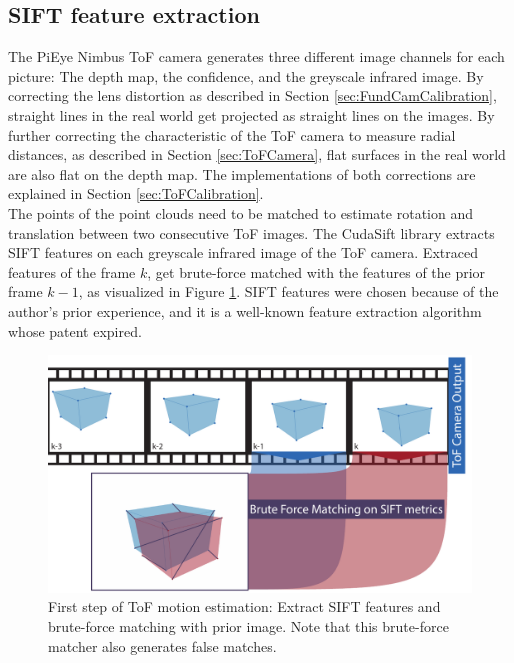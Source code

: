 \subsection{SIFT feature extraction}
\label{sec:ToFPosition_SIFT}
The PiEye Nimbus ToF camera generates three different image channels for each picture: The depth map, the confidence, and the greyscale infrared image. By correcting the lens distortion as described in Section \ref{sec:FundCamCalibration}, straight lines in the real world get projected as straight lines on the images. By further correcting the characteristic of the ToF camera to measure radial distances, as described in Section \ref{sec:ToFCamera}, flat surfaces in the real world are also flat on the depth map. The implementations of both corrections are explained in Section \ref{sec:ToFCalibration}. \\
The points of the point clouds need to be matched to estimate rotation and translation between two consecutive ToF images. The CudaSift library\cite{cudaSiftRepo}\cite{CudaSiftPublication} extracts SIFT\cite{siftpaper} features on each greyscale infrared image of the ToF camera. Extraced features of the frame $k$, get brute-force matched with the features of the prior frame $k-1$, as visualized in Figure \ref{im:SiftExtraction}. SIFT features were chosen because of the author's prior experience, and it is a well-known feature extraction algorithm whose patent expired.\cite{siftpatent}
\begin{figure}[H]
    \centering
    \includegraphics[width=1.0\textwidth]{images/feature_matching_bruteforce.pdf}
    \caption{First step of ToF motion estimation: Extract SIFT features and brute-force matching with prior image. Note that this brute-force matcher also generates false matches.}
    \label{im:SiftExtraction}
\end{figure}
